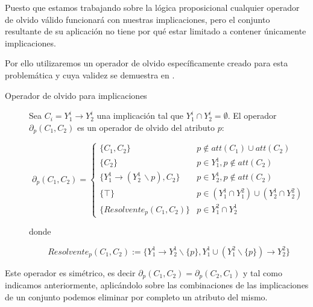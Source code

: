 	Puesto que estamos trabajando sobre la lógica proposicional cualquier operador de olvido válido funcionará con nuestras implicaciones, pero el conjunto resultante de su aplicación no tiene por qué estar limitado a contener únicamente implicaciones. 
	
	Por ello utilizaremos un operador de olvido específicamente creado para esta problemática y cuya validez se demuestra en .
	
	\begin{description}
		\item[Operador de olvido para implicaciones] 
			Sea $C_i = Y_{1}^i \rightarrow Y_{2}^i$  una implicación tal que $Y_{1}^i \cap Y_{2}^i = \emptyset$. El operador $\partial_p (C_1, C_2)$ es un operador de olvido del atributo $p$:
			
			\[ 
				\partial_p (C_1, C_2) = 			
					\begin{cases} 
						\{C_1, C_2\} & p \notin att(C_1) \cup att(C_2) \\
						\{C_2\} &  p \in Y_1^1, p \notin att(C_2) \\
						\{Y_1^1 \rightarrow (Y_2^1 \, \backslash p) , C_2\} & p \in Y_2^1, p \notin att(C_2) \\
						\{ \top \} & p \in (Y_1^1 \cap Y_1^2) \cup (Y_2^1 \cap Y_2^2) \\
						\{Resolvente_p(C_1, C_2)\} & p \in Y_1^2 \cap Y_2^1
					\end{cases}
			\] 
			
			donde 
			
			\[
				Resolvente_p(C_1, C_2) := \{Y_1^1 \rightarrow Y_2^1 \backslash \{p\}, Y_1^1 \cup (Y_1^2 \backslash \{p\}) \rightarrow Y_2^2 \}
			\]
	\end{description}

	Este operador es simétrico, es decir $\partial_p (C_1, C_2) = \partial_p (C_2, C_1)$ y tal como indicamos anteriormente, aplicándolo sobre las combinaciones de las implicaciones de un conjunto podemos eliminar por completo un atributo del mismo.
	


